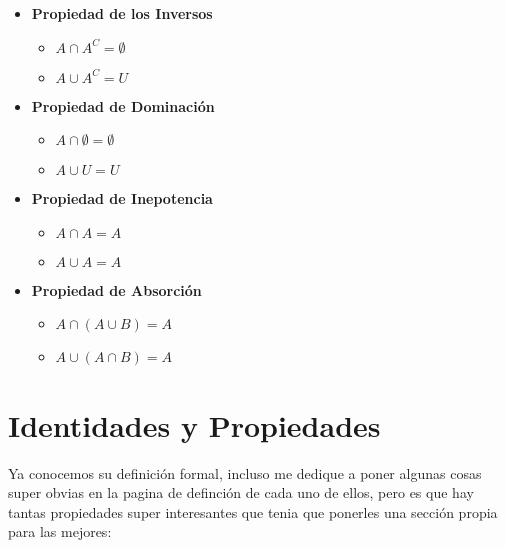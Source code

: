 \documentclass[12pt]{report}                                    %
\begin{document}
\begin{itemize}
            \item \textbf{Propiedad de los Inversos}
                \begin{itemize}
                    \item $A \cap A^C = \emptyset$
                    \item $A \cup A^C = U$
                \end{itemize}

            \item \textbf{Propiedad de Dominación}
                \begin{itemize}
                    \item $A \cap \emptyset = \emptyset$
                    \item $A \cup U = U$
                \end{itemize}

            \item \textbf{Propiedad de Inepotencia}
                \begin{itemize}
                    \item $A \cap A = A$
                    \item $A \cup A = A$
                \end{itemize}

            \item \textbf{Propiedad de Absorción}
                \begin{itemize}
                    \item $A \cap (A \cup B) = A$
                    \item $A \cup (A \cap B) = A$
                \end{itemize}

        \end{itemize}


    \clearpage
    \section{Identidades y Propiedades}
            
        Ya conocemos su definición formal, incluso me dedique a poner algunas cosas super obvias en
        la pagina de definción de cada uno de ellos, pero es que hay tantas propiedades super interesantes
        que tenia que ponerles una sección propia para las mejores:
\end{document}
